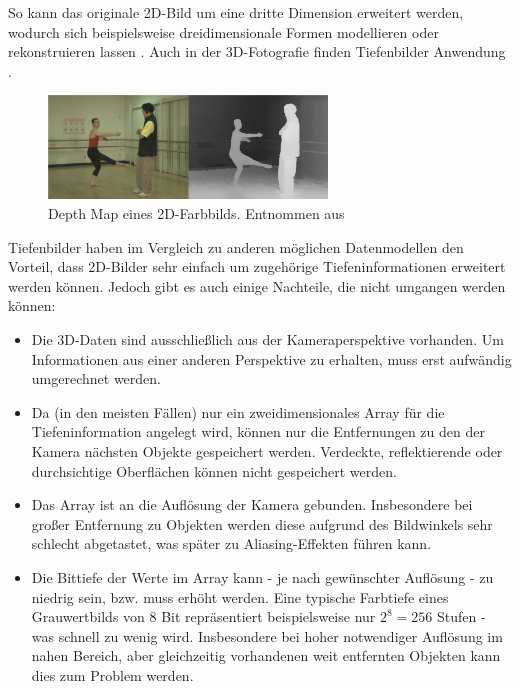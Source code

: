 So kann das originale 2D-Bild um eine dritte Dimension erweitert werden, wodurch sich beispielsweise dreidimensionale Formen modellieren oder rekonstruieren lassen \cite{arsalan2017synthesizing}.
Auch in der 3D-Fotografie finden Tiefenbilder Anwendung \cite{redert2006philips}.

\begin{figure}[ht]
	\centering
	\includegraphics[width=0.66\textwidth]{images/depth_map.png}
	\caption{Depth Map eines 2D-Farbbilds. Entnommen aus \cite[S.649]{muller2010depth}}
	\label{fig:depth_map}
\end{figure}

Tiefenbilder haben im Vergleich zu anderen möglichen Datenmodellen den Vorteil, dass 2D-Bilder sehr einfach um zugehörige Tiefeninformationen erweitert werden können.
Jedoch gibt es auch einige Nachteile, die nicht umgangen werden können:

\begin{itemize}
\item Die 3D-Daten sind ausschließlich aus der Kameraperspektive vorhanden.
Um Informationen aus einer anderen Perspektive zu erhalten, muss erst aufwändig umgerechnet werden.
\item Da (in den meisten Fällen) nur ein zweidimensionales Array für die Tiefeninformation angelegt wird, können nur die Entfernungen zu den der Kamera nächsten Objekte gespeichert werden.
Verdeckte, reflektierende oder durchsichtige Oberflächen können nicht gespeichert werden.
\item Das Array ist an die Auflösung der Kamera gebunden.
Insbesondere bei großer Entfernung zu Objekten werden diese aufgrund des Bildwinkels sehr schlecht abgetastet, was später zu Aliasing-Effekten führen kann.
\item Die Bittiefe der Werte im Array kann - je nach gewünschter Auflösung - zu niedrig sein, bzw. muss erhöht werden.
Eine typische Farbtiefe eines Grauwertbilds von 8 Bit repräsentiert beispielsweise nur $2^8 = 256$ Stufen - was schnell zu wenig wird.
Insbesondere bei hoher notwendiger Auflösung im nahen Bereich, aber gleichzeitig vorhandenen weit entfernten Objekten kann dies zum Problem werden.
\end{itemize}


